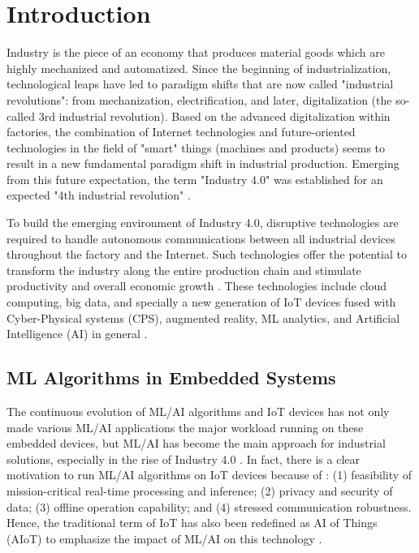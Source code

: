 \section{Introduction}
Industry is the piece of an economy that produces material goods which are highly mechanized and automatized. Since the beginning of industrialization, technological leaps have led to paradigm shifts that are now called "industrial revolutions": from mechanization, electrification, and later, digitalization (the so-called 3rd industrial revolution). Based on the advanced digitalization within factories, the combination of Internet technologies and future-oriented technologies in the field of "smart" things (machines and products) seems to result in a new fundamental paradigm shift in industrial production. Emerging from this future expectation, the term "Industry 4.0" was established for an expected "4th industrial revolution" \cite{lasi2014industry}.

To build the emerging environment of Industry 4.0, disruptive technologies are required to handle autonomous communications between all industrial devices throughout the factory and the Internet. Such technologies offer the potential to transform the industry along the entire production chain and stimulate productivity and overall economic growth \cite{espinoza2020estimating}. These technologies include cloud computing, big data, and specially a new generation of IoT devices fused with Cyber-Physical systems (CPS), augmented reality, ML analytics, and Artificial Intelligence (AI) in general \cite{alcacer2019scanning}.

\subsection{ML Algorithms in Embedded Systems}
The continuous evolution of ML/AI algorithms and IoT devices has not only made various ML/AI applications the major workload running on these embedded devices, but ML/AI has become the main approach for industrial solutions, especially in the rise of Industry 4.0 \cite{alcacer2019scanning}. In fact, there is a clear motivation to run ML/AI algorithms on IoT devices because of \cite{loh20201}: (1) feasibility of mission-critical real-time processing and inference; (2) privacy and security of data; (3) offline operation capability; and (4) stressed communication robustness. Hence, the traditional term of IoT has also been redefined as AI of Things (AIoT) to emphasize the impact of ML/AI on this technology \cite{zhang2020empowering}.

